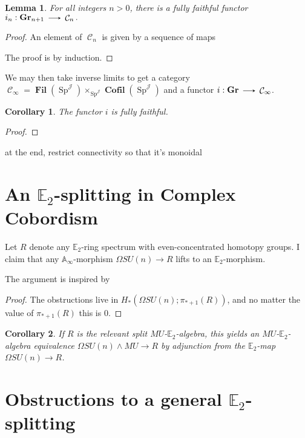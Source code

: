 \documentclass[11pt]{article}
\theoremstyle{definition}
\theoremstyle{plain}
\newtheorem{lem}[nul]{Lemma}
\newtheorem{cor}{Corollary}[nul]
\numberwithin{equation}{nul}
\theoremstyle{TheoremNum}
\DeclareMathOperator{\C}{\mathcal{C}}
\DeclareMathOperator{\J}{\mathcal{J}}
\DeclareMathOperator{\Gr}{\textbf{Gr}}
\DeclareMathOperator{\Fil}{\textbf{Fil}}
\DeclareMathOperator{\Cofil}{\textbf{Cofil}}
\DeclareMathOperator{\Sp}{\text{Sp}}
\DeclareMathOperator{\smsh}{\wedge}
\renewcommand{\to}{\ \tikz[baseline]\draw[>=stealth,->](0,0.5ex)--(0.5,0.5ex);\ }
\begin{document}
\begin{lem}
For all integers $n>0$, there is a fully faithful functor $i_n:\Gr_{n+1} \to \C_n.$  
\end{lem}
\begin{proof}
An element of $\C_n$ is given by a sequence of maps 

The proof is by induction.  
\end{proof}

We may then take inverse limits to get a category $\C_\infty = \Fil(\Sp^{\J}) \times_{\Sp^{\J}} \Cofil(\Sp^{\J})$ and a functor $i: \Gr \to \C_\infty$. 

\begin{cor}
The functor $i$ is fully faithful.
\end{cor}
\begin{proof}
\end{proof}


at the end, restrict connectivity so that it's monoidal








\section{An $\mathbb{E}_2$-splitting in Complex Cobordism}

Let $R$ denote any $\mathbb{E}_2$-ring spectrum with even-concentrated homotopy groups.  I claim that any $\mathbb{A}_\infty$-morphism $\Omega SU(n) \rightarrow R$ lifts to an $\mathbb{E}_2$-morphism.

The argument is inspired by \cite{ChadwickMandell}
\begin{proof}
The obstructions live in $H_*(\Omega SU(n);\pi_{*+1}(R))$, and no matter the value of $\pi_{*+1}(R)$ this is $0$.
\end{proof}

\begin{cor}
If $R$ is the relevant split $MU$-$\mathbb{E}_2$-algebra, this yields an $MU$-$\mathbb{E}_2$-algebra equivalence $\Omega SU(n) \smsh MU \rightarrow R$ by adjunction from the $\mathbb{E}_2$-map $\Omega SU(n) \rightarrow R$.
\end{cor}

\section{Obstructions to a general $\mathbb{E}_2$-splitting}
\end{document}
